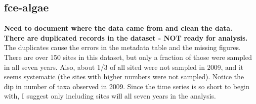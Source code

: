 \documentclass[11pt, oneside]{article}
\begin{document}
\subsection {fce-algae}
{\bf Need to document where the data came from and clean the data.}
{\bf There are duplicated records in the dataset - NOT ready for analysis.}
The duplicates cause the errors in the metadata table and the missing figures.
There are over 150 sites in this dataset, but only a fraction of those were sampled in all seven years.
Also, about 1/3 of all sited were not sampled in 2009, and it seems systematic (the sites with higher numbers were not sampled).
Notice the dip in number of taxa observed in 2009.
Since the time series is so short to begin with, I suggest only including sites will all seven years in the analysis.
\end{document}
